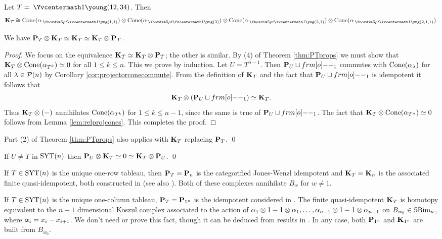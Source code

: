 \begin{example} Let $T = {\: \Yvcentermath1 \young(12,34)}$. Then \[ \KB_T \cong \Cone(\a_{\yoo}) \ot \Cone(\a_{\yh}) \ot \Cone(\a_{\yho}) \ot \Cone(\a_{\ytoo}).\] \end{example}

\begin{lemma}\label{lemma:KabsorbsP}
We have ${\mathbf P}_T\otimes {\mathbf K}_T\simeq {\mathbf K}_T\simeq {\mathbf K}_T\otimes {\mathbf P}_T$.
\end{lemma}
\begin{proof}
We focus on the equivalence ${\mathbf K}_T\simeq {\mathbf K}_T\otimes {\mathbf P}_T$; the other is similar.  By (4) of Theorem \ref{thm:PTprops} we must show that ${\mathbf K}_T\otimes \operatorname{Cone}(\alpha_{T^k})\simeq 0$ for all $1\leq k\leq n$.  This we prove by induction.  Let $U = T^{n-1}$. Then $\PB_U\sqcup\one_1$ commutes with $\operatorname{Cone}(\alpha_\lambda)$ for all $\lambda\in {\mathcal{P}}(n)$ by Corollary \ref{cor:projectorconecommute}. From the definition of ${\mathbf K}_T$ and the fact that $\PB_U\sqcup \one_1$ is idempotent it follows that
\begin{equation}
\KB_T \otimes (\PB_U\sqcup \one_1)\simeq \KB_T.
\end{equation}
Thus ${\mathbf K}_T\otimes(-)$ annihilates $\operatorname{Cone}(\alpha_{T^k})$ for $1\leq k\leq n-1$, since the same is true of $\PB_U\sqcup \one_1$.  The fact that ${\mathbf K}_T\otimes \operatorname{Cone}(\alpha_{T^n})\simeq 0$ follows from Lemma \ref{lem:relprojcones}.  This completes the proof.
\end{proof}

\begin{cor} \label{cor:KBtoo} Part (2) of Theorem \ref{thm:PTprops} also applies with ${\mathbf K}_T$ replacing ${\mathbf P}_T$. \qed \end{cor}

\begin{cor} If $U \ne T$ in $\operatorname{SYT}(n)$ then ${\mathbf P}_U \otimes {\mathbf K}_T \simeq 0 \simeq {\mathbf K}_T \otimes {\mathbf P}_U$. \qed \end{cor}

\begin{example}
If $T\in \operatorname{SYT}(n)$ is the unique one-row tableau, then ${\mathbf P}_T={\mathbf P}_n$ is the categorified Jones-Wenzl idempotent and ${\mathbf K}_T={\mathbf K}_n$ is the associated finite quasi-idempotent, both constructed in \cite{Hog15} (see also \cite{ElHog16a}).  Both of these complexes annihilate $B_w$ for $w\neq 1$.
\end{example}

\begin{example} \label{ex:Konecolumn}
If $T\in \operatorname{SYT}(n)$ is the unique one-column tableau, ${\mathbf P}_T={\mathbf P}_{1^n}$ is the idempotent considered in \cite{AbHog17}.  The finite quasi-idempotent ${\mathbf K}_T$ is homotopy equivalent to the $n-1$ dimensional Koszul complex associated to the action of $\alpha_1\otimes 1-1\otimes \alpha_1,\ldots,\alpha_{n-1}\otimes 1 -1\otimes \alpha_{n-1}$ on $B_{w_0}\in {\mathbb{S}}{\rm Bim }_n$, where $\alpha_i=x_i-x_{i+1}$.  We don't need or prove this fact, though it can be deduced from results in \cite{AbHog17}.  In any case, both ${\mathbf P}_{1^n}$ and ${\mathbf K}_{1^n}$ are built from $B_{w_0}$.
\end{example}


